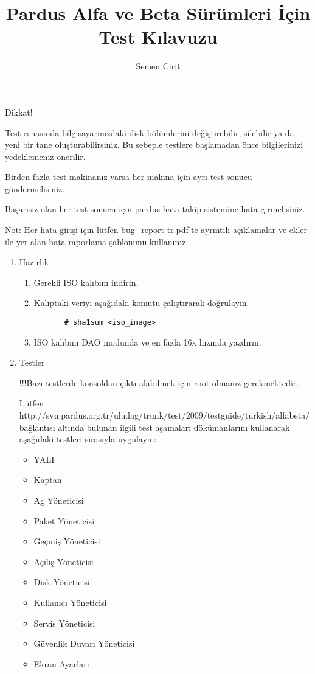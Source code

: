 \documentclass[a4paper,10pt]{article}
\title{Pardus Alfa ve Beta Sürümleri İçin Test Kılavuzu}
\author{Semen Cirit}
\begin{document}
\maketitle

Dikkat!

    Test esnasında bilgisayarınızdaki disk bölümlerini değiştirebilir, silebilir ya da yeni bir tane oluşturabilirsiniz. Bu sebeple testlere başlamadan önce bilgilerinizi yedeklemeniz önerilir.
    
    Birden fazla test makinanız varsa her makina için ayrı test sonucu göndermelisiniz.

    Başarısız olan her test sonucu için pardus hata takip sistemine hata girmelisiniz.

    Not: Her hata girişi için lütfen bug\_report-tr.pdf'te ayrıntılı açıklamalar ve ekler ile yer alan hata raporlama şablonunu kullanınız.

\begin{enumerate}
\item Hazırlık
  \begin{enumerate}
    \item Gerekli ISO kalıbını indirin.
    \item Kalıptaki veriyi aşağıdaki komutu çalıştırarak doğrulayın.
      \begin{verbatim}
       # sha1sum <iso_image>
      \end{verbatim}
    \item ISO kalıbını DAO modunda ve en fazla 16x hızında yazdırın.
  \end{enumerate}
  \item Testler
    
 	!!!Bazı testlerde konsoldan çıktı alabilmek için root olmanız gerekmektedir.
	
    Lütfen http://svn.pardus.org.tr/uludag/trunk/test/2009/testguide/turkish/alfabeta/ bağlantısı altında bulunan ilgili test aşamaları dökümanlarını kullanarak aşağıdaki testleri sırasıyla uygulayın:
    \begin{itemize}
    \item YALI
    \item Kaptan
    \item Ağ Yöneticisi
    \item Paket Yöneticisi
    \item Geçmiş Yöneticisi
    \item Açılış Yöneticisi
    \item Disk Yöneticisi
    \item Kullanıcı Yöneticisi
    \item Servis Yöneticisi
    \item Güvenlik Duvarı Yöneticisi
    \item Ekran Ayarları
    \end{itemize}
 \end{enumerate}
\end{document}
